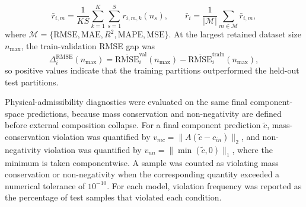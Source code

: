 \documentclass[a4paper,fleqn]{cas-sc}
\newenvironment{revblock}{\begingroup\color{revDefault}}{\endgroup}
\newenvironment{revblockr25}{\begingroup\color{revRtwoFive}}{\endgroup}
\begin{document}
\begin{revblock}
\begin{revblockr25}
\begin{equation}
\bar{r}_{i,m} = \frac{1}{KS} \sum_{k=1}^{K} \sum_{s=1}^{S} r_{i,m,k}(n_s),
\qquad
\bar{r}_{i} = \frac{1}{|\mathcal{M}|} \sum_{m \in \mathcal{M}} \bar{r}_{i,m},
\end{equation}
where $\mathcal{M} = \{\mathrm{RMSE},\mathrm{MAE},R^2,\mathrm{MAPE},\mathrm{MSE}\}$. At the largest retained dataset size $n_{\max}$, the train-validation RMSE gap was
\begin{equation}
\Delta_i^{\mathrm{RMSE}}(n_{\max}) = \overline{\mathrm{RMSE}}^{\mathrm{val}}_i(n_{\max}) - \overline{\mathrm{RMSE}}^{\mathrm{train}}_i(n_{\max}),
\end{equation}
so positive values indicate that the training partitions outperformed the held-out test partitions.

Physical-admissibility diagnostics were evaluated on the same final component-space predictions, because mass conservation and non-negativity are defined before external composition collapse. For a final component prediction $\tilde{c}$, mass-conservation violation was quantified by $v_{mc} = \|A(\tilde{c} - c_{in})\|_2$, and non-negativity violation was quantified by $v_{nn} = \|\min(\tilde{c}, 0)\|_1$, where the minimum is taken componentwise. A sample was counted as violating mass conservation or non-negativity when the corresponding quantity exceeded a numerical tolerance of $10^{-10}$. For each model, violation frequency was reported as the percentage of test samples that violated each condition.
\end{revblockr25}

\end{revblock}
\end{document}
